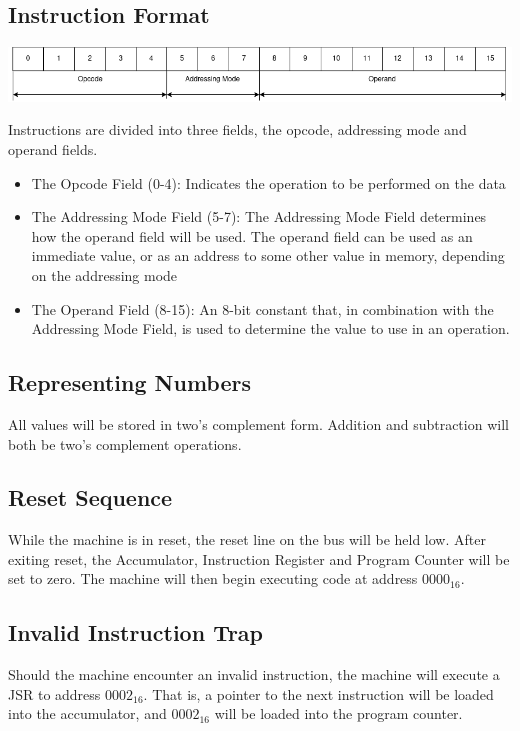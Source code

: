 \documentclass[11pt]{article}
\begin{document}
    \subsection{Instruction Format}\label{subsec:instruction-format}
    \begin{center}
        \includegraphics[scale=0.40]{Instruction_Format}
    \end{center}
    \par Instructions are divided into three fields, the opcode, addressing mode and operand fields.
    \begin{itemize}
        \item The Opcode Field (0-4): Indicates the operation to be performed on the data
        \item The Addressing Mode Field (5-7): The Addressing Mode Field determines how the operand field will be used.
        The operand field can be used as an immediate value, or as an address to some other value in memory,
        depending on the addressing mode
        \item The Operand Field (8-15): An 8-bit constant that, in combination with the Addressing Mode Field, is
        used to determine the value to use in an operation.
    \end{itemize}

    \subsection{Representing Numbers}\label{subsec:representing-numbers}
    \par All values will be stored in two's complement form.
    Addition and subtraction will both be two's complement operations.


    \subsection{Reset Sequence}\label{subsec:reset-sequence}
    \par While the machine is in reset, the reset line on the bus will be held low.
    After exiting reset, the Accumulator, Instruction Register and Program Counter will
    be set to zero.
    The machine will then begin executing code at address $0000_{16}$.


    \subsection{Invalid Instruction Trap}\label{subsec:invalid-instruction-trap}
    \par Should the machine encounter an invalid instruction, the machine will execute a JSR to address $0002_{16}$.
    That is, a pointer to the next instruction will be loaded into the accumulator, and $0002_{16}$ will be loaded
    into the program counter.
    \pagebreak
\end{document}
